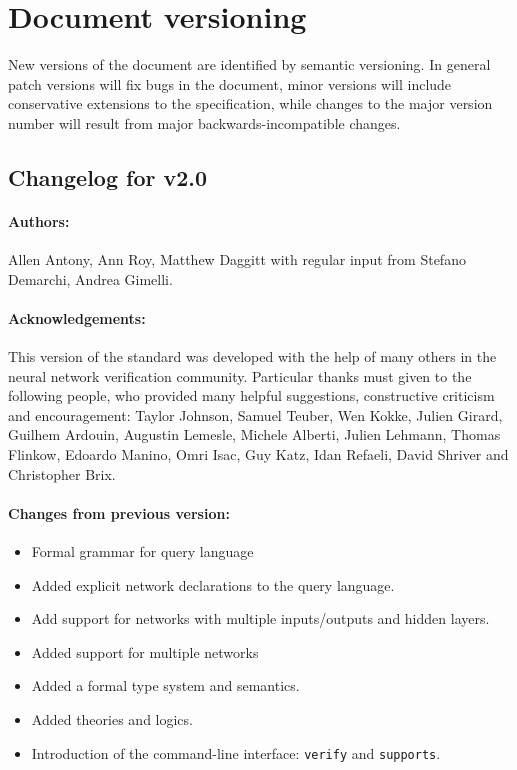 \section{Document versioning}

New versions of the document are identified by semantic versioning. In general patch versions will fix bugs in the document, minor versions will include conservative extensions to the specification, while changes to the major version number will result from major backwards-incompatible changes.

\subsection*{Changelog for v2.0}

\paragraph{Authors:} Allen Antony, Ann Roy, Matthew Daggitt with regular input from Stefano Demarchi, Andrea Gimelli.

\noindent \paragraph{Acknowledgements:} This version of the standard was developed with the help of many others in the neural network verification community.
Particular thanks must given to the following people, who provided many helpful suggestions, constructive criticism and encouragement: Taylor Johnson, Samuel Teuber, Wen Kokke, Julien Girard, Guilhem Ardouin, Augustin Lemesle, Michele Alberti, Julien Lehmann, Thomas Flinkow, Edoardo Manino, Omri Isac, Guy Katz, Idan Refaeli, David Shriver and Christopher Brix.

\noindent \paragraph{Changes from previous version:}
\begin{itemize}
\item Formal grammar for query language
\item Added explicit network declarations to the query language.
\item Add support for networks with multiple inputs/outputs and hidden layers.
\item Added support for multiple networks
\item Added a formal type system and semantics.
\item Added theories and logics.
\item Introduction of the command-line interface: \texttt{verify} and \texttt{supports}.
\end{itemize}

